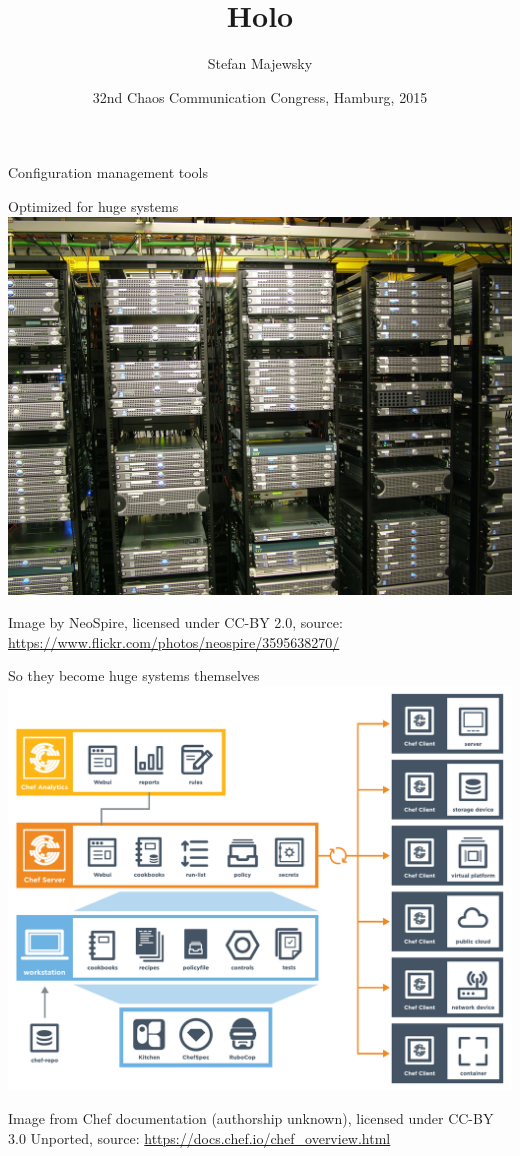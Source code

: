 \documentclass{beamer}
\title{Holo}
\author{Stefan Majewsky}
\date[32C3]{32nd Chaos Communication Congress, Hamburg, 2015}
\begin{document}
\begin{frame}[plain,c]
 \centering
 \LARGE Configuration management tools
\end{frame}

\begin{frame}[plain,t]{Optimized for huge systems}
 \centering
 \includegraphics[height=0.8\textheight]{datacenter.jpg}
 \par\Tiny Image by NeoSpire, licensed under CC-BY 2.0, source: \url{https://www.flickr.com/photos/neospire/3595638270/}
\end{frame}

\begin{frame}[plain,t]{So they become huge systems themselves}
 \centering
 \includegraphics[height=0.8\textheight]{chef_overview.pdf}
 \par\Tiny Image from Chef documentation (authorship unknown), licensed under CC-BY 3.0 Unported, source: \url{https://docs.chef.io/chef_overview.html}
\end{frame}
\end{document}
